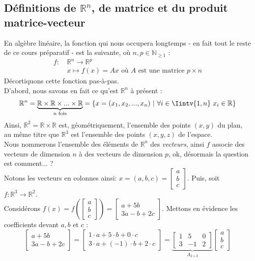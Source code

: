 \documentclass{article}
\newcommand{\R}{\mathbb{R}}
\begin{document}
\subsection{Définitions de $\R^n$, de matrice et du produit matrice-vecteur}
\noindent En algèbre linéaire, la fonction qui nous occupera longtemps - en fait tout le reste de ce cours préparatif - est la suivante, où $n,p \in \mathbb{N}_{\geq 1}$ :
\begin{align*}
    f: \ &\R^n \to \R^p\\
    &x \mapsto f(x) = Ax \text{ où $A$ est une matrice } p \times n
\end{align*}
Décortiquons cette fonction pas-à-pas.\\
D'abord, nous savons en fait ce qu'est $\R^n$ à présent : 
$$\R^n = \underbrace{\R \times \R \times ... \times \R}_{n \text{ fois}} = \{x=(x_1, x_2, ..., x_n) \ | \ \forall i \in \Iintv{1, n}\ x_i \in \R\}$$
Ainsi, $\R^2 = \R \times \R$ est, géométriquement, l'ensemble des points $(x,y)$ du plan, au même titre que $\R^3$ est l'ensemble des points $(x,y,z)$ de l'espace.\\
Nous nommerons l'ensemble des éléments de $\R^n$ des \textit{vecteurs}, ainsi $f$ associe des vecteurs de dimension $n$ à des vecteurs de dimension $p$, ok, désormais la question est comment... ?\\
Notons les vecteurs en colonnes ainsi: $x = (a,b,c) = \begin{bmatrix}a \\ b \\ c \end{bmatrix}$. Puis, soit $f: \R^3 \to \R^2$.\\
Considérons $f(x) = f\left(\begin{bmatrix}a \\ b \\ c \end{bmatrix} \right) = \begin{bmatrix}a+5b \\ 3a-b+2c \end{bmatrix}$. Mettons en évidence les coefficients devant $a, b$ et $c$ :
$$\begin{bmatrix}a+5b \\ 3a-b+2c \end{bmatrix} = \begin{bmatrix}1 \cdot a+5\cdot b + 0 \cdot c \\ 3 \cdot a + (-1) \cdot b+2 \cdot c \end{bmatrix} = \underbrace{\begin{bmatrix} 1 & 5 & 0 \\3 & -1 & 2 \end{bmatrix}}_{A_{2 \times 3}} \begin{bmatrix}a \\ b \\ c \end{bmatrix}
$$
\end{document}
